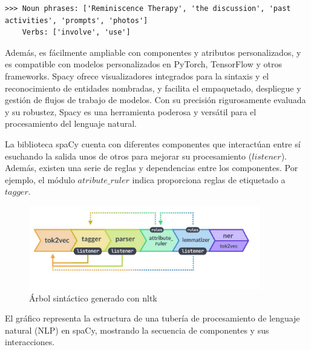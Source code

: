 \begin{lstlisting}[style=SpyderStyle, caption={Resultado de tokenización usando spaCy}, captionpos=b, label={lst:python},breaklines = true]
	>>> Noun phrases: ['Reminiscence Therapy', 'the discussion', 'past activities', 'prompts', 'photos']
	Verbs: ['involve', 'use']
\end{lstlisting}

Además, es fácilmente ampliable con componentes y atributos personalizados, y es compatible con modelos personalizados en PyTorch, TensorFlow y otros frameworks. Spacy ofrece visualizadores integrados para la sintaxis y el reconocimiento de entidades nombradas, y facilita el empaquetado, despliegue y gestión de flujos de trabajo de modelos. Con su precisión rigurosamente evaluada y su robustez, Spacy es una herramienta poderosa y versátil para el procesamiento del lenguaje natural.

La biblioteca spaCy cuenta con diferentes componentes que interactúan entre sí esuchando la salida unos de otros para mejorar su procesamiento ($listener$). Además, existen una serie de reglas y dependencias entre los componentes. Por ejemplo, el módulo $atribute\_ruler$ indica proporciona reglas de etiquetado a $tagger$.

\begin{figure}[h]
	\centering
	\includegraphics[width=0.9\textwidth]{Imagenes/spaCy}
	\caption{Árbol sintáctico generado con nltk}
	\label{fig:1}
\end{figure}

El gráfico representa la estructura de una tubería de procesamiento de lenguaje natural (NLP) en spaCy, mostrando la secuencia de componentes y sus interacciones.

